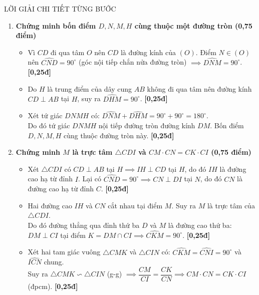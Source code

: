 \documentclass[11pt,a4paper]{article}
\begin{document}
\begin{solutionbox}{LỜI GIẢI CHI TIẾT TỪNG BƯỚC}
\begin{enumerate}[label=\textbf{\arabic*.}, leftmargin=*]
    \item \textbf{Chứng minh bốn điểm $D, N, M, H$ cùng thuộc một đường tròn (0,75 điểm)}
    \begin{itemize}[leftmargin=*, nosep]
        \item Vì $CD$ đi qua tâm $O$ nên $CD$ là đường kính của $(O)$. Điểm $N \in (O)$ nên $\widehat{CND} = 90^\circ$ (góc nội tiếp chắn nửa đường tròn) $\implies \widehat{DNM} = 90^\circ$. \hfill \textbf{[0,25đ]}
        \item Do $H$ là trung điểm của dây cung $AB$ không đi qua tâm nên đường kính $CD \perp AB$ tại $H$, suy ra $\widehat{DHM} = 90^\circ$. \hfill \textbf{[0,25đ]}
        \item Xét tứ giác $DNMH$ có: $\widehat{DNM} + \widehat{DHM} = 90^\circ + 90^\circ = 180^\circ$.\\
        Do đó tứ giác $DNMH$ nội tiếp đường tròn đường kính $DM$. Bốn điểm $D, N, M, H$ cùng thuộc đường tròn này. \hfill \textbf{[0,25đ]}
    \end{itemize}

    \vspace{1mm}
    \item \textbf{Chứng minh $M$ là trực tâm $\triangle CDI$ và $CM \cdot CN = CK \cdot CI$ (0,75 điểm)}
    \begin{itemize}[leftmargin=*, nosep]
        \item Xét $\triangle CDI$ có $CD \perp AB$ tại $H \implies IH \perp CD$ tại $H$, do đó $IH$ là đường cao hạ từ đỉnh $I$. Lại có $\widehat{CND} = 90^\circ \implies CN \perp DI$ tại $N$, do đó $CN$ là đường cao hạ từ đỉnh $C$. \hfill \textbf{[0,25đ]}
        \item Hai đường cao $IH$ và $CN$ cắt nhau tại điểm $M$. Suy ra $M$ là trực tâm của $\triangle CDI$.\\
        Do đó đường thẳng qua đỉnh thứ ba $D$ và $M$ là đường cao thứ ba: $DM \perp CI$ tại điểm $K = DM \cap CI \implies \widehat{CKM} = 90^\circ$. \hfill \textbf{[0,25đ]}
        \item Xét hai tam giác vuông $\triangle CMK$ và $\triangle CIN$ có:
        $\widehat{CKM} = \widehat{CNI} = 90^\circ$ và $\widehat{ICN}$ chung.\\
        Suy ra $\triangle CMK \backsim \triangle CIN$ (g-g) $\implies \dfrac{CM}{CI} = \dfrac{CK}{CN} \implies CM \cdot CN = CK \cdot CI$ (đpcm). \hfill \textbf{[0,25đ]}
    \end{itemize}


\end{enumerate}
\end{solutionbox}
\end{document}
